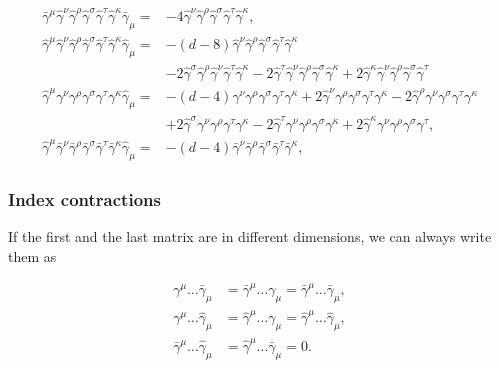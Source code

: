 \documentclass[../FeynCalcManual.tex]{subfiles}
\begin{document}
\begin{align}
\bar{\gamma}^\mu \hat{\gamma}^\nu \hat{\gamma}^\rho \hat{\gamma}^\sigma \hat{\gamma}^\tau \hat{\gamma}^\kappa \bar{\gamma}_\mu =& -4 \hat{\gamma}^\nu \hat{\gamma}^\rho \hat{\gamma}^\sigma \hat{\gamma}^\tau \hat{\gamma}^\kappa , \\
\hat{\gamma}^\mu \hat{\gamma}^\nu \hat{\gamma}^\rho \hat{\gamma}^\sigma \hat{\gamma}^\tau \hat{\gamma}^\kappa \hat{\gamma}_\mu =& -(d-8) \hat{\gamma}^\nu \hat{\gamma}^\rho \hat{\gamma}^\sigma \hat{\gamma}^\tau \hat{\gamma}^\kappa  \\
&- 2  \hat{\gamma}^\sigma \hat{\gamma}^\rho \hat{\gamma}^\nu \hat{\gamma}^\tau \hat{\gamma}^\kappa - 2 \hat{\gamma}^\tau \hat{\gamma}^\nu \hat{\gamma}^\rho \hat{\gamma}^\sigma \hat{\gamma}^\kappa + 2 \hat{\gamma}^\kappa \hat{\gamma}^\nu \hat{\gamma}^\rho \hat{\gamma}^\sigma \hat{\gamma}^\tau \\
\hat{\gamma}^\mu \gamma^\nu \gamma^\rho \gamma^\sigma \gamma^\tau \gamma^\kappa \hat{\gamma}_\mu =& -(d-4) \gamma^\nu \gamma^\rho \gamma^\sigma \gamma^\tau \gamma^\kappa +  2 \hat{\gamma}^\nu \gamma^\rho \gamma^\sigma \gamma^\tau  \gamma^\kappa - 2\hat{\gamma}^\rho \gamma^\nu \gamma^\sigma \gamma^\tau \gamma^\kappa \\
& + 2 \hat{\gamma}^\sigma \gamma^\nu \gamma^\rho \gamma^\tau \gamma^\kappa  - 2 \hat{\gamma}^\tau \gamma^\nu \gamma^\rho \gamma^\sigma \gamma^\kappa +2 \hat{\gamma}^\kappa \gamma^\nu \gamma^\rho \gamma^\sigma \gamma^\tau,  \\
\hat{\gamma}^\mu \bar{\gamma}^\nu \bar{\gamma}^\rho \bar{\gamma}^\sigma \bar{\gamma}^\tau \bar{\gamma}^\kappa \hat{\gamma}_\mu =& -(d-4) \bar{\gamma}^\nu \bar{\gamma}^\rho \bar{\gamma}^\sigma \bar{\gamma}^\tau \bar{\gamma}^\kappa,
\end{align}

\subsubsection{Index contractions}\label{index-contractions}

If the first and the last matrix are in different dimensions, we can
always write them as

\begin{align}
\gamma^\mu \dots \bar{\gamma}_\mu & = \bar{\gamma}^\mu \dots \gamma_\mu = \bar{\gamma}^\mu \dots \bar{\gamma}_\mu, \\
\gamma^\mu \dots \hat{\gamma}_\mu & = \hat{\gamma}^\mu \dots \gamma_\mu = \hat{\gamma}^\mu \dots \hat{\gamma}_\mu, \\
\bar{\gamma}^\mu \dots \hat{\gamma}_\mu & = \hat{\gamma}^\mu \dots \bar{\gamma}_\mu = 0.
\end{align}
\end{document}
